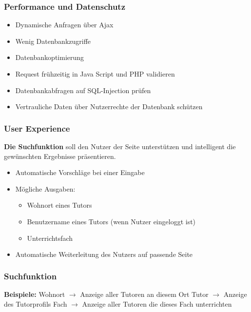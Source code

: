 \begin{frame} 
  \frametitle{Performance und Datenschutz}
  \begin{itemize}
    \item Dynamische Anfragen über Ajax
    \item Wenig Datenbankzugriffe
    \item Datenbankoptimierung
  \end{itemize} 
  \begin{itemize}
    \item Request frühzeitig in Java Script und PHP validieren 
    \item Datenbankabfragen auf SQL-Injection prüfen
    \item Vertrauliche Daten über Nutzerrechte der Datenbank schützen
  \end{itemize}
\end{frame}

\begin{frame}
  \frametitle{User Experience}
  \textbf{Die Suchfunktion} soll den Nutzer der Seite unterstützen und intelligent die 
  gewünschten Ergebnisse präsentieren. \newline \newline
  \begin{itemize}
    \item Automatische Vorschläge bei einer Eingabe
    \item Mögliche Ausgaben:
    \begin{itemize}
      \item Wohnort eines Tutors
      \item Benutzername eines Tutors (wenn Nutzer eingeloggt ist)
      \item Unterrichtsfach
    \end{itemize}
    \item Automatische Weiterleitung des Nutzers auf passende Seite
  \end{itemize} 
 \end{frame}
 
 \begin{frame}
   \frametitle{Suchfunktion}
    \textbf{Beispiele:} \newline
   Wohnort $\rightarrow$ Anzeige aller Tutoren an diesem Ort \newline
    Tutor $\rightarrow$ Anzeige des Tutorprofils \newline
    Fach $\rightarrow$ Anzeige aller Tutoren die dieses Fach unterrichten \newline
 \end{frame}
 